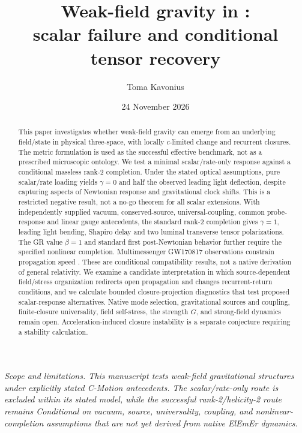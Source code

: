\documentclass[11pt]{article}
\title{\textbf{Weak-field gravity in \cmotion{}:\\scalar failure and conditional tensor recovery}}
\author{Toma Kavonius}
\date{24 November 2026}
\theoremstyle{plain}
\theoremstyle{remark}
\begin{document}
\maketitle

\begin{center}
\small\itshape
Scope and limitations.  This manuscript tests weak-field gravitational structures under
explicitly stated C-Motion antecedents.  The scalar/rate-only route is excluded within
its stated model, while the successful rank-2/helicity-2 route remains Conditional on
vacuum, source, universality, coupling, and nonlinear-completion assumptions that are
not yet derived from native ElEmEr dynamics.
\end{center}
\vspace{0.6em}

\begin{abstract}
This paper investigates whether weak-field gravity can emerge from an
underlying field/state in physical three-space, with locally $c$-limited
change and recurrent closures. The metric formulation is used as the successful effective
benchmark, not as a prescribed microscopic ontology. We test a minimal
scalar/rate-only response against a conditional massless rank-2 completion.
Under the stated optical assumptions, pure scalar/rate loading yields
$\gamma=0$ and half the observed leading light deflection, despite capturing
aspects of Newtonian response and gravitational clock shifts. This is a
restricted negative result, not a no-go theorem for all scalar extensions.
With independently supplied vacuum, conserved-source, universal-coupling,
common probe-response and linear gauge antecedents, the standard rank-2
completion gives $\gamma=1$, leading light bending, Shapiro delay and two
luminal transverse tensor polarizations. The GR value $\beta=1$ and standard
first post-Newtonian behavior further require the specified nonlinear
completion. Multimessenger GW170817 observations constrain propagation speed
\cite{Abbott2017GW170817Gamma}. These are conditional compatibility results, not a native derivation
of general relativity. We examine a candidate interpretation in which
source-dependent field/stress organization redirects open propagation and
changes recurrent-return conditions, and we calculate bounded closure-projection
diagnostics that test proposed scalar-response alternatives. Native mode
selection, gravitational sources and coupling, finite-closure universality,
field self-stress, the strength $G$, and strong-field dynamics remain open.
Acceleration-induced closure instability is a separate conjecture requiring a
stability calculation.
\end{abstract}
\end{document}
